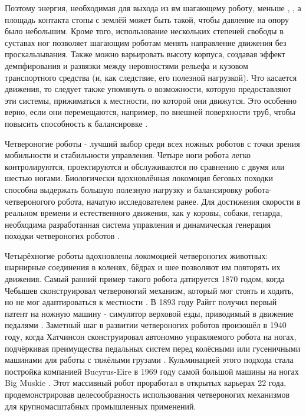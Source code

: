 Поэтому энергия, необходимая для выхода из ям шагающему роботу, меньше \cite{Bekker1962}, \cite{bekker1969}, а площадь контакта стопы с землёй может быть такой, чтобы давление на опору было небольшим. Кроме того, использование нескольких степеней свободы в суставах ног позволяет шагающим роботам менять направление движения без проскальзывания. Также можно варьировать высоту корпуса, создавая эффект демпфирования и развязки между неровностями рельефа и кузовом транспортного средства (и, как следствие, его полезной нагрузкой). Что касается движения, то следует также упомянуть о возможности, которую предоставляют эти системы, прижиматься к местности, по которой они движутся. Это особенно верно, если они перемещаются, например, по внешней поверхности труб, чтобы повысить способность к балансировке \cite{Kaneko2002}.

Четвероногие роботы - лучший выбор среди всех ножных роботов с точки зрения мобильности и стабильности управления. Четыре ноги робота легко контролируются, проектируются и обслуживаются по сравнению с двумя или шестью ногами. Биологически вдохновлённая локомоция беговых походки способна выдержать большую полезную нагрузку и балансировку робота-четвероногого робота, начатую исследователем ранее. Для достижения скорости в реальном времени и естественного движения, как у коровы, собаки, гепарда, необходима разработанная система управления и динамическая генерация походки четвероногих роботов \cite{gonccalves2013}.

Четырёхногие роботы вдохновлены локомоцией четвероногих животных: шарнирные соединения в коленях, бёдрах и шее позволяют им повторять их движения. Самый ранний пример такого робота датируется 1870 годом, когда Чебышев сконструировал четвероногий механизм, который мог стоять и ходить, но не мог адаптироваться к местности \cite{Cheb1948}. В 1893 году Райгг получил первый патент на ножную машину - симулятор верховой езды, приводимый в движение педалями \cite{patent}. Заметный шаг в развитии четвероногих роботов произошёл в 1940 году, когда Хатчинсон сконструировал автономно управляемого робота на ногах, подчёркивая преимущества педальных систем перед колёсными или гусеничными машинами для работы с тяжёлыми грузами \cite{Hutchinson1967}.  Кульминацией этого подхода стала постройка компанией Bucyrus-Eire в 1969 году самой большой машины на ногах Big Muskie \cite{haddock2001extreme}. Этот массивный робот проработал в открытых карьерах 22 года, продемонстрировав целесообразность использования четвероногих механизмов для крупномасштабных промышленных применений.

